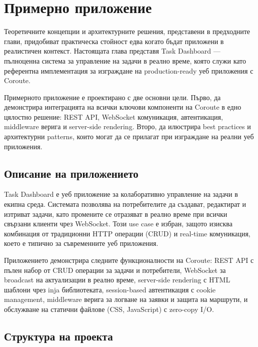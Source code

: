 \section{Примерно приложение}
\label{sec:example_app}

Теоретичните концепции и архитектурните решения, представени в предходните глави, придобиват практическа стойност едва когато бъдат приложени в реалистичен контекст. Настоящата глава представя Task Dashboard --- пълноценна система за управление на задачи в реално време, която служи като референтна имплементация за изграждане на production-ready уеб приложения с Coroute.

Примерното приложение е проектирано с две основни цели. Първо, да демонстрира интеграцията на всички ключови компоненти на Coroute в едно цялостно решение: REST API, WebSocket комуникация, автентикация, middleware верига и server-side rendering. Второ, да илюстрира best practices и архитектурни patterns, които могат да се прилагат при изграждане на реални уеб приложения.

\subsection{Описание на приложението}

Task Dashboard е уеб приложение за колаборативно управление на задачи в екипна среда. Системата позволява на потребителите да създават, редактират и изтриват задачи, като промените се отразяват в реално време при всички свързани клиенти чрез WebSocket. Този use case е избран, защото изисква комбинация от традиционни HTTP операции (CRUD) и real-time комуникация, което е типично за съвременните уеб приложения.

Приложението демонстрира следните функционалности на Coroute: REST API с пълен набор от CRUD операции за задачи и потребители, WebSocket за broadcast на актуализации в реално време, server-side rendering с HTML шаблони чрез inja библиотеката, session-based автентикация с cookie management, middleware верига за логване на заявки и защита на маршрути, и обслужване на статични файлове (CSS, JavaScript) с zero-copy I/O.

\subsection{Структура на проекта}

